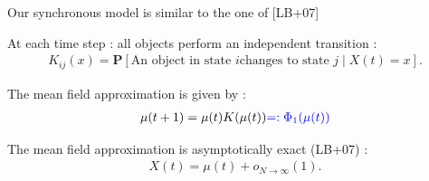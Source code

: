 \documentclass{beamer}
\newcommand\blue[1]{{\color{blue}#1}}
\newcommand\Proba[1]{\mathbf{P}\left[#1\right]}
\begin{document}
\begin{frame}{Our synchronous model is similar to the one of [LB+07]}
  
  At each time step : all objects perform an independent transition :
  \begin{align*}
    K_{ij}(x) = \Proba{\text{An object in state $i$
    changes to state $j$} \mid X(t)=x}.
  \end{align*}
  
  The mean field approximation is given by :
  \begin{align*}
    \mu(t+1) = \mu(t)K(\mu(t)) \blue{=: \Phi_1(\mu(t))}
  \end{align*}

  \bigskip The mean field approximation is asymptotically exact
  (LB+07) :
  \begin{align*}
    X(t)=\mu(t)+o_{N\to\infty}(1).
  \end{align*}
\end{frame}
\end{document}
